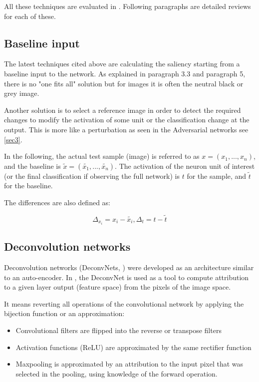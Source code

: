 All these techniques are evaluated in \cite{Ancona2018}. Following paragraphs are detailed reviews for each of these.

\subsection{Baseline input}

The latest techniques cited above are calculating the saliency starting from a baseline input to the network. As explained in \cite{Shrikumar2017} paragraph 3.3 and  \cite{Sundararajan2017} paragraph 5, there is no "one fits all" solution but for images it is often the neutral black or grey image.

Another solution is to select a reference image in order to detect the required changes to modify the activation of some unit or the classification change at the output. This is more like a perturbation as seen in the Adversarial networks see \ref{sec3}.

In the following, the actual test sample (image) is referred to as \(x = (x_1, ..., x_n)\), and the baseline is \(\tilde{x} = (\tilde{x_1}, ..., \tilde{x_n})\). The activation of the neuron unit of interest (or the final classification if observing the full network) is \(t\) for the sample, and \(\tilde{t}\) for the baseline. 

The differences are also defined as: 

\[ \Delta_{x_i} = x_i - \tilde{x_i}, \Delta_{t} = t - \tilde{t} \]

\subsection{Deconvolution networks}
\cite{Zeiler2013}

Deconvolution networks (DeconvNets, \cite{Zeiler2011}) were developed as an architecture similar to an auto-encoder. In \cite{Zeiler2013}, the DeconvNet is used as a tool to compute attribution to a given layer output (feature space) from the pixels of the image space.

It means reverting all operations of the convolutional network by applying the bijection function or an approximation:
\begin{itemize}
    \item Convolutional filters are flipped into the reverse or transpose filters
    \item Activation functions (ReLU) are approximated by the same rectifier function
    \item Maxpooling is approximated by an attribution to the input pixel that was selected in the pooling, using knowledge of the forward operation.
\end{itemize}

